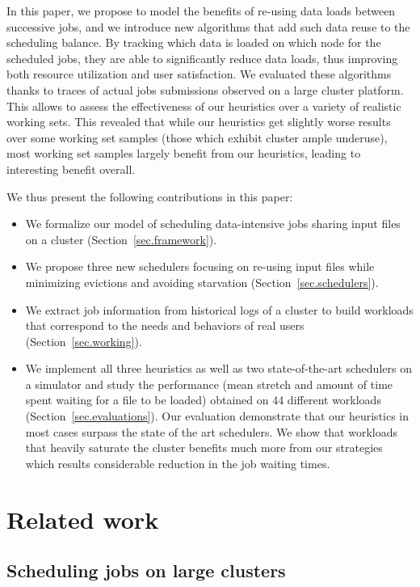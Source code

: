 \documentclass[conference,10pt]{IEEEtran}
\begin{document}
In this paper, we propose to model the benefits of re-using data loads
between successive jobs, and we introduce new algorithms that add such
data reuse to the scheduling balance. By tracking which data is loaded
on which node for the scheduled jobs, they are able to significantly
reduce data loads, thus improving both resource utilization and user
satisfaction. We evaluated these algorithms thanks to traces of actual
jobs submissions observed on a large cluster platform. This allows to
assess the effectiveness of our heuristics over a variety of realistic
working sets. This revealed that while our heuristics get slightly worse
results over some working set samples (those which exhibit cluster ample
underuse), most working set samples largely benefit from our heuristics,
leading to interesting benefit overall.

We thus present the following contributions in this paper:
\begin{itemize}
	\item We formalize our model of scheduling data-intensive jobs sharing input files on a cluster (Section~\ref{sec.framework}).
	\item We propose three new schedulers focusing on re-using input files while minimizing evictions and avoiding starvation (Section~\ref{sec.schedulers}).
	\item We extract job information from historical logs of a cluster to build workloads that correspond to the needs and behaviors of real users (Section~\ref{sec.working}).
	\item We implement all three heuristics as well as two state-of-the-art schedulers on a simulator and study the performance (mean stretch and amount of time spent waiting for a file to be loaded) obtained on 44 different workloads (Section~\ref{sec.evaluations}).
	Our evaluation demonstrate that our heuristics in most cases surpass the state of the art schedulers.
	We show that workloads that heavily saturate the cluster
                benefits much more from our strategies which results
                considerable reduction in the job waiting times.
\end{itemize}

\section{Related work}\label{sec.related_work}

\subsection{Scheduling jobs on large clusters}
\end{document}
